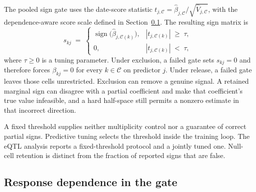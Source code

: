 \documentclass[lineno,pdflatex,sn-basic]{sn-jnl}
\theoremstyle{thmstyleone}
\begin{document}
The pooled sign gate uses the date-score statistic
$t_{j,\mathcal C}=\hat\beta_{j,\mathcal C}/\sqrt{\widehat V_{j,\mathcal C}}$,
with the dependence-aware score scale defined in
Section~\ref{sec:weighted-gate}. The resulting sign matrix is
%
\begin{equation} \label{eq:gate}
	s_{kj} \;=\;
	\begin{cases}
		\operatorname{sign}\bigl(\hat{\beta}_{j, \mathcal{C}(k)}\bigr), &
		|t_{j, \mathcal{C}(k)}| \;\geq\; \tau, \\
		0, & |t_{j, \mathcal{C}(k)}| \;<\; \tau,
	\end{cases}
\end{equation}
%
where $\tau\geq0$ is a tuning parameter. Under exclusion, a failed gate sets
$s_{kj}=0$ and therefore forces $\beta_{kj}=0$ for every $k\in\mathcal C$ on
predictor $j$. Under release, a failed gate leaves those cells unrestricted.
Exclusion can remove a genuine signal. A retained marginal sign can disagree
with a partial coefficient and make that coefficient's true value infeasible,
and a hard half-space still permits a nonzero estimate in that incorrect
direction.

A fixed threshold supplies neither multiplicity control nor a guarantee of
correct partial signs. Predictive tuning selects the threshold inside the
training loop. The eQTL analysis reports a fixed-threshold protocol and a
jointly tuned one. Null-cell retention is distinct from the fraction of
reported signs that are false.

\subsection{Response dependence in the gate}\label{sec:weighted-gate}
\end{document}
